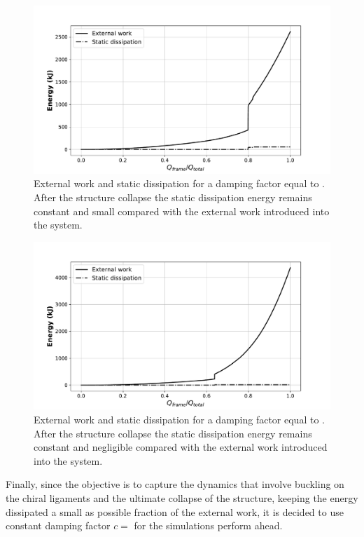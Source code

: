     \begin{figure}[!htpb]
      \centering
      \includegraphics[width=0.8 \textwidth]{figures/result-model/energy_damp-8}
      \caption[External work and static dissipation for a damping factor equal to ]{External work and static dissipation for a damping factor equal to . After the structure collapse the static dissipation energy remains constant and small compared with the external work introduced into the system.}\label{fig:energy_damp-8}
    \end{figure}

    \begin{figure}[!htpb]
      \centering
      \includegraphics[width=0.8 \textwidth]{figures/result-model/energy_damp-9}
      \caption[External work and static dissipation for a damping factor equal to ]{External work and static dissipation for a damping factor equal to . After the structure collapse the static dissipation energy remains constant and negligible compared with the external work introduced into the system.}\label{fig:energy_damp-9}
    \end{figure}

    Finally, since the objective is to capture the dynamics that involve buckling on the chiral ligaments and the ultimate collapse of the structure, keeping the energy dissipated a small as possible fraction of the external work, it is decided to use constant damping factor $c =$ for the simulations perform ahead. 

